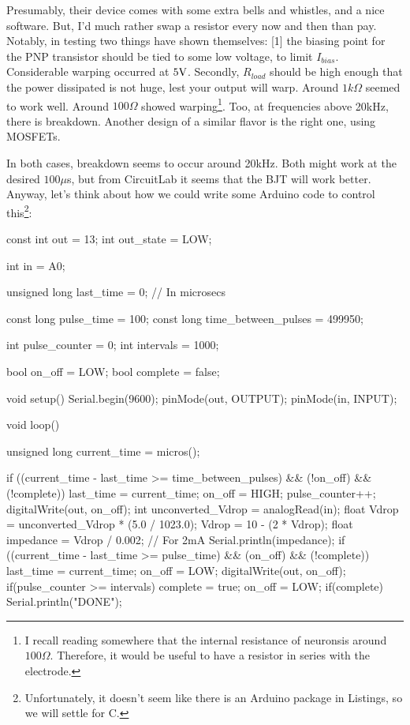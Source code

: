 \documentclass[12pt]{report}
\newcommand{\V}{{\rm V}}
\begin{document}
Presumably, their device comes with some extra bells and whistles, and a nice software. But, I'd much rather swap a resistor every now and then than pay. Notably, in testing two things have shown themselves: [1] the biasing point for the PNP transistor should be tied to some low voltage, to limit $I_{bias}$. Considerable warping occurred at $5\V$. Secondly, $R_{load}$ should be high enough that the power dissipated is not huge, lest your output will warp. Around $1k\Omega$ seemed to work well. Around $100\Omega$ showed warping\footnote{I recall reading somewhere that the internal resistance of neuronsis around $100\Omega$. Therefore, it would be useful to have a resistor in series with the electrode.}. Too, at frequencies above 20kHz, there is breakdown. Another design of a similar flavor is the right one, using MOSFETs.

In both cases, breakdown seems to occur around 20kHz. Both might work at the desired $100\mu$s, but from CircuitLab it seems that the BJT will work better. Anyway, let's think about how we could write some Arduino code to control this\footnote{Unfortunately, it doesn't seem like there is an Arduino package in Listings, so we will settle for C.}: 

\begin{CPP}
const int out = 13;  
int out_state = LOW;  

int in = A0;

unsigned long last_time = 0; // In microsecs

const long pulse_time = 100; 
const long time_between_pulses = 499950; 

int pulse_counter = 0;
int intervals = 1000;

bool on_off = LOW;
bool complete = false;

void setup() {
  Serial.begin(9600);
  pinMode(out, OUTPUT);
  pinMode(in, INPUT);
}

void loop() {
  unsigned long current_time = micros(); 

  if ((current_time - last_time >= time_between_pulses) && (!on_off) && (!complete)) {
    last_time = current_time;
    on_off = HIGH;
    pulse_counter++;
    digitalWrite(out, on_off);
    int unconverted_Vdrop = analogRead(in);
    float Vdrop = unconverted_Vdrop * (5.0 / 1023.0);
    Vdrop = 10 - (2 * Vdrop); 
    float impedance = Vdrop / 0.002; // For 2mA
    Serial.println(impedance);
  }
   if ((current_time - last_time >= pulse_time) && (on_off) && (!complete)) {
    last_time = current_time;
    on_off = LOW;
    digitalWrite(out, on_off);
  }
  if(pulse_counter >= intervals){
    complete = true;
    on_off = LOW;
  }
  if(complete){
    Serial.println("DONE");
  }
}
\end{CPP}
\end{document}
